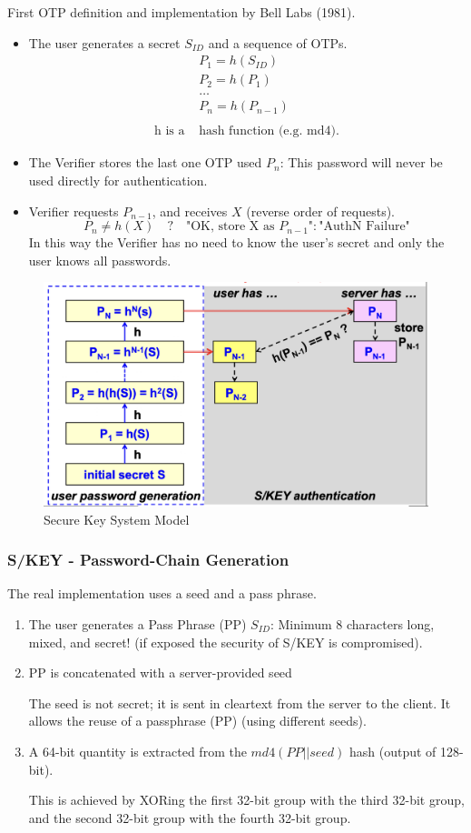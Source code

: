 First OTP definition and implementation by Bell Labs (1981). 
\begin{itemize}
    \item The user generates a secret $S_{ID}$ and a sequence of OTPs.
    \[
        \begin{aligned}
            &P_1 = h(S_{ID}) \\
            &P_2 = h(P_1) \\
            &\dots \\
            &P_n = h(P_{n-1})\\\\
            \text{h is a } &\text{hash } \text{function (e.g. md4).}
        \end{aligned}
    \]
    \item The Verifier stores the last one OTP used $P_n$: This password will never be used directly for authentication.
    \item Verifier requests $P_{n-1}$, and receives $X$ (reverse order of requests).
    \[
        P_n \ne h(X)\quad ?\quad \text{"OK, store X as } P_{n-1}\text{"} : \text{"AuthN Failure"}
    \]
    In this way the Verifier has no need to know the user's secret and only the user knows all passwords.
\end{itemize}

\begin{figure}[H]
    \centering
    \includegraphics[width=0.5\linewidth]{Images/Authentication/skey.png}
    \caption{Secure Key System Model}
\end{figure}

\subsubsection*{S/KEY - Password-Chain Generation}
\begin{center}
    The real implementation uses a seed and a pass phrase.
\end{center}
\begin{enumerate}
    \item The user generates a Pass Phrase (PP) $S_{ID}$: Minimum 8 characters long, mixed, and secret! (if exposed the security of S/KEY is compromised).
    \item PP is concatenated with a server-provided seed 
    
    The seed is not secret; it is sent in cleartext from the server to the client. It allows the reuse of a passphrase (PP) (using different seeds).
    \item A 64-bit quantity is extracted from the $md4(PP||seed)$ hash (output of 128-bit).
    
    This is achieved by XORing the first 32-bit group with the third 32-bit group, and the second 32-bit group with the fourth 32-bit group.
\end{enumerate}

